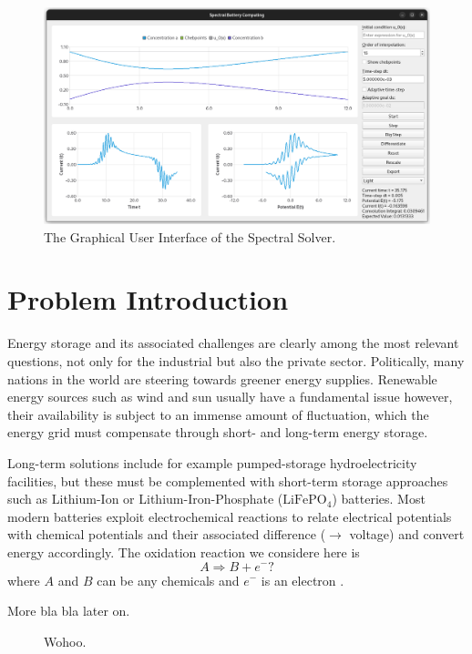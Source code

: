\documentclass{prettytex/ox/mmsc-special-topic}
\begin{document}
  \begin{figure}[H]
    \centering
    \includegraphics[width=\linewidth]{figures/screenshot.png}
    \caption{The Graphical User Interface of the Spectral Solver.}
  \end{figure}

  \pagebreak
  \pagestyle{normal}

  \tableofcontents
  \pagebreak

  \section{Problem Introduction}
  Energy storage and its associated challenges are clearly among the most relevant questions, not only for the industrial but also the private sector.
  Politically, many nations in the world are steering towards greener energy supplies.
  Renewable energy sources such as wind and sun usually have a fundamental issue however, their availability is subject to an immense amount of fluctuation, which the energy grid must compensate through short- and long-term energy storage.

  Long-term solutions include for example pumped-storage hydroelectricity facilities, but these must be complemented with short-term storage approaches such as Lithium-Ion or Lithium-Iron-Phosphate ($\text{LiFePO}_4$) batteries.
  Most modern batteries exploit electrochemical reactions to relate electrical potentials with chemical potentials and their associated difference ($\rightarrow$ voltage) and convert energy accordingly.
  The oxidation reaction we considere here is
  $$A \Rightarrow B + e^-?$$
  where $A$ and $B$ can be any chemicals and $e^-$ is an electron \parencite{Gavaghan2000Jan}.

  More bla bla later on.

  \begin{figure}[H]
    \centering
    \caption{Wohoo.}
    \label{fig:battery-schema}
  \end{figure}
\end{document}
